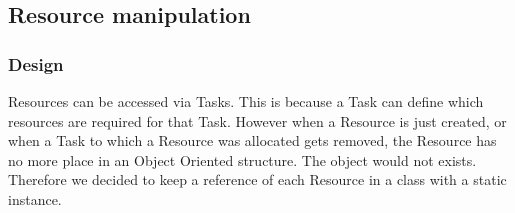 		\subsection{Resource manipulation}
			\subsubsection{Design}
			Resources can be accessed via Tasks. This is because a Task can define which resources are required for that Task.
			However when a Resource is just created, or when a Task to which a Resource was allocated gets removed, the Resource has no more place in an Object Oriented structure. The object would not exists.
			Therefore we decided to keep a reference of each Resource in a class with a static instance.

